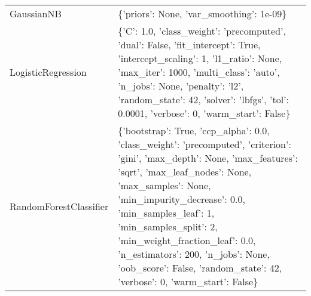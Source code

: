 \begin{tabular}{p{4.3cm}|p{9cm}}
            GaussianNB &                                                                                                                                                                                                                                                                                                                                                                                                                                                       \{'priors': None, 'var\_smoothing': 1e-09\} \\
    LogisticRegression &                                                                                                                                                                                                   \{'C': 1.0, 'class\_weight': 'precomputed', 'dual': False, 'fit\_intercept': True, 'intercept\_scaling': 1, 'l1\_ratio': None, 'max\_iter': 1000, 'multi\_class': 'auto', 'n\_jobs': None, 'penalty': 'l2', 'random\_state': 42, 'solver': 'lbfgs', 'tol': 0.0001, 'verbose': 0, 'warm\_start': False\} \\
RandomForestClassifier &                                                                                \{'bootstrap': True, 'ccp\_alpha': 0.0, 'class\_weight': 'precomputed', 'criterion': 'gini', 'max\_depth': None, 'max\_features': 'sqrt', 'max\_leaf\_nodes': None, 'max\_samples': None, 'min\_impurity\_decrease': 0.0, 'min\_samples\_leaf': 1, 'min\_samples\_split': 2, 'min\_weight\_fraction\_leaf': 0.0, 'n\_estimators': 200, 'n\_jobs': None, 'oob\_score': False, 'random\_state': 42, 'verbose': 0, 'warm\_start': False\} \\
\bottomrule
\end{tabular}
